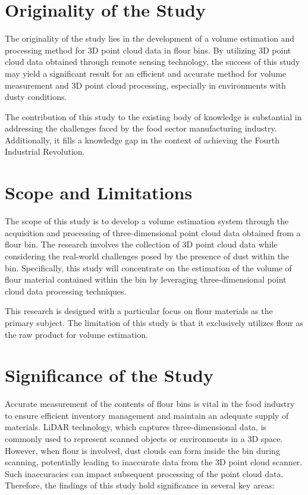 \section{Originality of the Study}
\label{intro:sec:Originality of the Study}
The originality of the study lies in the development of a volume estimation and processing method for 3D point cloud data in flour bins. By utilizing 3D point cloud data obtained through remote sensing technology, the success of this study may yield a significant result for an efficient and accurate method for volume measurement and 3D point cloud processing, especially in environments with dusty conditions.

The contribution of this study to the existing body of knowledge is substantial in addressing the challenges faced by the food sector manufacturing industry. Additionally, it fills a knowledge gap in the context of achieving the Fourth Industrial Revolution.

\section{Scope and Limitations}
\label{intro:sec:Scope and Limitations}
The scope of this study is to develop a volume estimation system through the acquisition and processing of three-dimensional point cloud data obtained from a flour bin. The research involves the collection of 3D point cloud data while considering the real-world challenges posed by the presence of dust within the bin. Specifically, this study will concentrate on the estimation of the volume of flour material contained within the bin by leveraging three-dimensional point cloud data processing techniques.

This research is designed with a particular focus on flour materials as the primary subject. The limitation of this study is that it exclusively utilizes flour as the raw product for volume estimation.

\section{Significance of the Study}
\label{intro:sec:Significance of the Study}
Accurate measurement of the contents of flour bins is vital in the food industry to ensure efficient inventory management and maintain an adequate supply of materials. LiDAR technology, which captures three-dimensional data, is commonly used to represent scanned objects or environments in a 3D space. However, when flour is involved, dust clouds can form inside the bin during scanning, potentially leading to inaccurate data from the 3D point cloud scanner. Such inaccuracies can impact subsequent processing of the point cloud data. Therefore, the findings of this study hold significance in several key areas:

